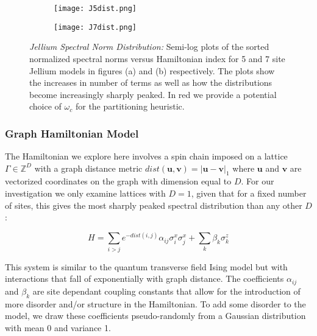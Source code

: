\begin{figure}[h!]
    \centering
        \begin{subfigure}[b]{.49\textwidth}
            \texttt{[image: J5dist.png]}
            \caption{}
        \end{subfigure}
        \begin{subfigure}[b]{.49\textwidth}
            \texttt{[image: J7dist.png]}
            \caption{}
        \end{subfigure}
        \caption{\textit{Jellium Spectral Norm Distribution:} Semi-log plots of the sorted normalized spectral norms versus Hamiltonian index for 5 and 7 site Jellium models in figures (a) and (b) respectively. The plots show the increases in number of terms as well as how the distributions become increasingly sharply peaked. In red we provide a potential choice of $\omega_c$ for the partitioning heuristic.} \label{fig:Jelliumspec}
\end{figure}
\FloatBarrier

\subsubsection{Graph Hamiltonian Model}
The Hamiltonian we explore here involves a spin chain imposed on a lattice $\Gamma \in \mathbb{Z}^D$ with a graph distance metric $dist(\mathbf{u},\mathbf{v}) = |\mathbf{u}-\mathbf{v}|_1$ where $\mathbf{u}$ and $\mathbf{v}$ are vectorized coordinates on the graph with dimension equal to $D$. For our investigation we only examine lattices with $D=1$, given that for a fixed number of sites, this gives the most sharply peaked spectral distribution than any other $D$:

\begin{equation}
    H = \sum_{i>j} e^{-dist(i,j)}\alpha_{ij} \sigma^x_i \sigma^x_j + \sum_k \beta_k \sigma_k^z
\end{equation}

This system is similar to the quantum transverse field Ising model but with interactions that fall of exponentially with graph distance. The coefficients $\alpha_{ij}$ and $\beta_k$ are site dependant coupling constants that allow for the introduction of more disorder and/or structure in the Hamiltonian. To add some disorder to the model, we draw these coefficients pseudo-randomly from a Gaussian distribution with mean 0 and variance 1. \\


